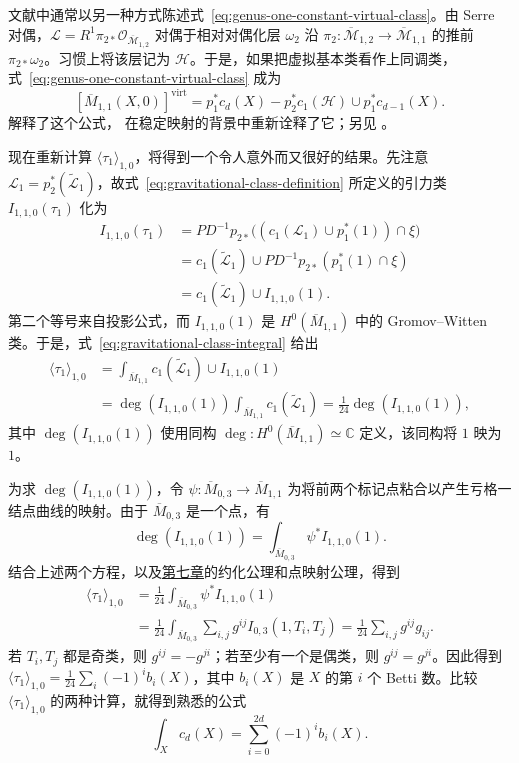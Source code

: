 \begin{example}
文献中通常以另一种方式陈述式~\eqref{eq:genus-one-constant-virtual-class}。由 Serre 对偶，$\mathcal L=R^1\pi_{2*}\mathcal O_{\overline{\mathcal M}_{1,2}}$ 对偶于相对对偶化层 $\omega_2$ 沿 $\pi_2:\overline{\mathcal M}_{1,2}\to\overline{\mathcal M}_{1,1}$ 的推前 $\pi_{2*}\omega_2$。习惯上将该层记为 $\mathcal H$。于是，如果把虚拟基本类看作上同调类，式~\eqref{eq:genus-one-constant-virtual-class} 成为
\[
[\overline M_{1,1}(X,0)]^{\mathrm{virt}}
=p_1^*c_d(X)-p_2^*c_1(\mathcal H)\cup p_1^*c_{d-1}(X).
\]
 解释了这个公式， 在稳定映射的背景中重新诠释了它；另见 。

现在重新计算 $\langle\tau_1\rangle_{1,0}$，将得到一个令人意外而又很好的结果。先注意 $\mathcal L_1=p_2^*(\widetilde{\mathcal L}_1)$，故式~\eqref{eq:gravitational-class-definition} 所定义的引力类 $I_{1,1,0}(\tau_1)$ 化为
\[
\begin{aligned}
I_{1,1,0}(\tau_1)
&=PD^{-1}p_{2*}\bigl((c_1(\mathcal L_1)\cup p_1^*(1))\cap\xi\bigr)\\
&=c_1(\widetilde{\mathcal L}_1)\cup PD^{-1}p_{2*}(p_1^*(1)\cap\xi)\\
&=c_1(\widetilde{\mathcal L}_1)\cup I_{1,1,0}(1).
\end{aligned}
\]
第二个等号来自投影公式，而 $I_{1,1,0}(1)$ 是 $H^0(\overline M_{1,1})$ 中的 Gromov--Witten 类。于是，式~\eqref{eq:gravitational-class-integral} 给出
\[
\begin{aligned}
\langle\tau_1\rangle_{1,0}
&=\int_{\overline M_{1,1}}c_1(\widetilde{\mathcal L}_1)\cup I_{1,1,0}(1)\\
&=\deg(I_{1,1,0}(1))\int_{\overline M_{1,1}}c_1(\widetilde{\mathcal L}_1)
=\frac1{24}\deg(I_{1,1,0}(1)),
\end{aligned}
\]
其中 $\deg(I_{1,1,0}(1))$ 使用同构 $\deg:H^0(\overline M_{1,1})\simeq\mathbb C$ 定义，该同构将 $1$ 映为 $1$。

为求 $\deg(I_{1,1,0}(1))$，令 $\psi:\overline M_{0,3}\to\overline M_{1,1}$ 为将前两个标记点粘合以产生亏格一结点曲线的映射。由于 $\overline M_{0,3}$ 是一个点，有
\[
\deg(I_{1,1,0}(1))=\int_{\overline M_{0,3}}\psi^*I_{1,1,0}(1).
\]
结合上述两个方程，以及\hyperref[chap:gromov-witten]{第七章}的约化公理和点映射公理，得到
\[
\begin{aligned}
\langle\tau_1\rangle_{1,0}
&=\frac1{24}\int_{\overline M_{0,3}}\psi^*I_{1,1,0}(1)\\
&=\frac1{24}\int_{\overline M_{0,3}}\sum_{i,j}g^{ij}I_{0,3}(1,T_i,T_j)
=\frac1{24}\sum_{i,j}g^{ij}g_{ij}.
\end{aligned}
\]
若 $T_i,T_j$ 都是奇类，则 $g^{ij}=-g^{ji}$；若至少有一个是偶类，则 $g^{ij}=g^{ji}$。因此得到 $\langle\tau_1\rangle_{1,0}=\frac1{24}\sum_i(-1)^ib_i(X)$，其中 $b_i(X)$ 是 $X$ 的第 $i$ 个 Betti 数。比较 $\langle\tau_1\rangle_{1,0}$ 的两种计算，就得到熟悉的公式
\[
\int_Xc_d(X)=\sum_{i=0}^{2d}(-1)^ib_i(X).
\]
\end{example}

